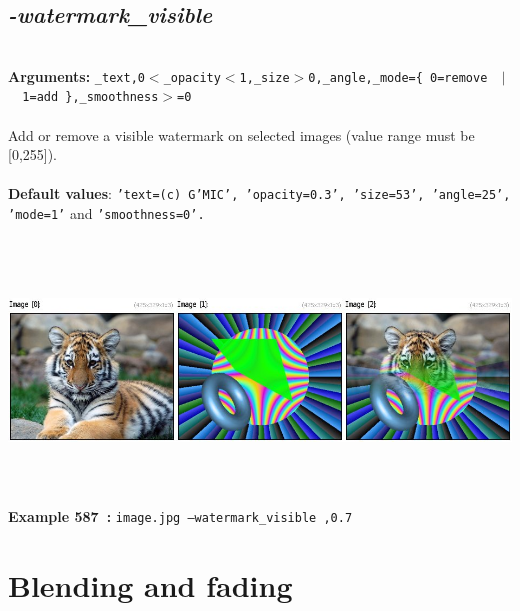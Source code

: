 \documentclass[a4paper,11pt,twoside]{book}
\begin{document}
\subsection{\emph{-watermark\_visible} }\vspace*{-0.5em}
~\\\textbf{Arguments: } 
{\small \texttt{\_text,0$<$\_opacity$<$1,\_size$>$0,\_angle,\_mode=\{ 0=remove ~$|$~ 1=add \},\_smoothness$>$=0}}\\~\\
Add or remove a visible watermark on selected images (value range must be [0,255]).
~\\~\\\textbf{Default values}: {\small \texttt{'text=(c) G'MIC', 'opacity=0.3', 'size=53', 'angle=25', 'mode=1'} and \texttt{'smoothness=0'.}}
\begin{center}\includegraphics[keepaspectratio=true,height=7cm,width=\textwidth]{img/gmic_def587.jpg}\\
{\footnotesize \textbf{Example 587~:} \texttt{image.jpg --watermark\_visible ,0.7}}
\end{center}
\section{Blending and fading}
\end{document}
